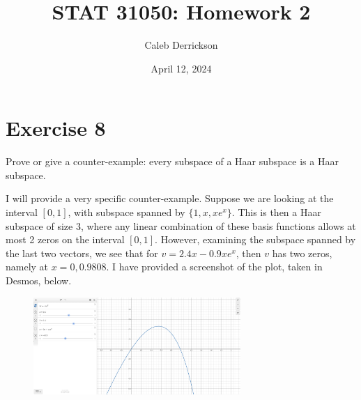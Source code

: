 

\title{STAT 31050: Homework 2}
\author{Caleb Derrickson}
\date{April 12, 2024}


\onehalfspacing
\maketitle
\allowdisplaybreaks
\tableofcontents


\newpage
\section{Exercise 8}
Prove or give a counter-example: every subspace of a Haar subspace is a Haar subspace.
\partbreak
\begin{solution}

    I will provide a very specific counter-example. Suppose we are looking at the interval $[0, 1]$, with subspace spanned by $\{1, x, xe^{x}\}$. This is then a Haar subspace of size 3, where any linear combination of these basis functions allows at most 2 zeros on the interval $[0, 1]$. However, examining the subspace spanned by the last two vectors, we see that for $v = 2.4x - 0.9xe^x$, then $v$ has two zeros, namely at $x = 0, 0.9808$. I have provided a screenshot of the plot, taken in Desmos, below. 

\end{solution}

\vspace{1.5in}
\begin{figure}[!ht]
    \centering
    \includegraphics[width = 0.7\textwidth]{Figures/Counterexample8.png}
\end{figure}
\clearpage

\newpage
